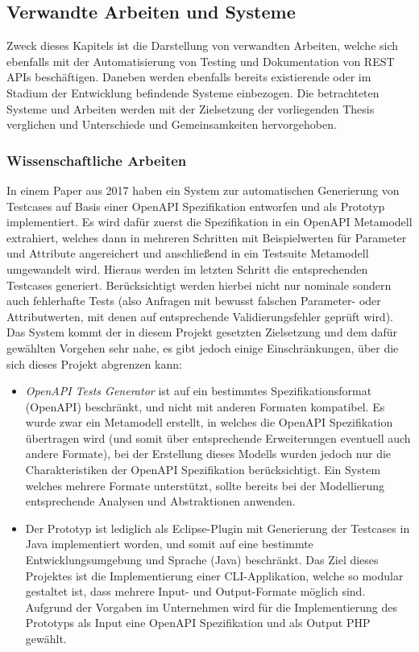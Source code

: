 \newpage

\subsection{Verwandte Arbeiten und Systeme}

Zweck dieses Kapitels ist die Darstellung von verwandten Arbeiten, welche sich ebenfalls mit der Automatisierung von Testing und Dokumentation von REST APIs beschäftigen. Daneben werden ebenfalls bereits existierende oder im Stadium der Entwicklung befindende Systeme einbezogen. Die betrachteten Systeme und Arbeiten werden mit der Zielsetzung der vorliegenden Thesis verglichen und Unterschiede und Gemeinsamkeiten hervorgehoben.

\subsubsection{Wissenschaftliche Arbeiten}

In einem Paper aus 2017 haben \textcite{ed2018automatic} ein System zur automatischen Generierung von Testcases auf Basis einer OpenAPI Spezifikation entworfen und als Prototyp implementiert. Es wird dafür zuerst die Spezifikation in ein OpenAPI Metamodell extrahiert, welches dann in mehreren Schritten mit Beispielwerten für Parameter und Attribute angereichert und anschließend in ein Testsuite Metamodell umgewandelt wird. Hieraus werden im letzten Schritt die entsprechenden Testcases generiert. Berücksichtigt werden hierbei nicht nur nominale sondern auch fehlerhafte Tests (also Anfragen mit bewusst falschen Parameter- oder Attributwerten, mit denen auf entsprechende Validierungsfehler geprüft wird). Das System kommt der in diesem Projekt gesetzten Zielsetzung und dem dafür gewählten Vorgehen sehr nahe, es gibt jedoch einige Einschränkungen, über die sich dieses Projekt abgrenzen kann:
	\begin{itemize}
		\item \emph{OpenAPI Tests Generator} ist auf ein bestimmtes Spezifikationsformat (OpenAPI) beschränkt, und nicht mit anderen Formaten kompatibel. Es wurde zwar ein Metamodell erstellt, in welches die OpenAPI Spezifikation übertragen wird (und somit über entsprechende Erweiterungen eventuell auch andere Formate), bei der Erstellung dieses Modells wurden jedoch nur die Charakteristiken der OpenAPI Spezifikation berücksichtigt. Ein System welches mehrere Formate unterstützt, sollte bereits bei der Modellierung entsprechende Analysen und Abstraktionen anwenden.
		\item Der Prototyp ist lediglich als Eclipse-Plugin mit Generierung der Testcases in Java implementiert worden, und somit auf eine bestimmte Entwicklungsumgebung und Sprache (Java) beschränkt. Das Ziel dieses Projektes ist die Implementierung einer CLI-Applikation, welche so modular gestaltet ist, dass mehrere Input- und Output-Formate möglich sind. Aufgrund der Vorgaben im Unternehmen wird für die Implementierung des Prototyps als Input eine OpenAPI Spezifikation und als Output PHP gewählt.
	\end{itemize}
	
